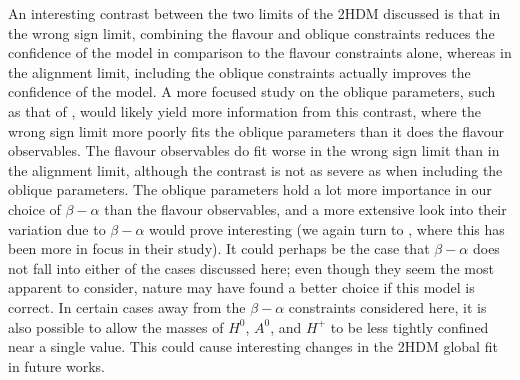 \documentclass[a4paper,12pt]{article}
\begin{document}
An interesting contrast between the two limits of the 2HDM discussed is that in the wrong sign limit, combining the flavour and oblique constraints reduces the confidence of the model in comparison to the flavour constraints alone, whereas in the alignment limit, including the oblique constraints actually improves the confidence of the model. 
A more focused study on the oblique parameters, such as that of \cite{james}, would likely yield more information from this contrast, where the wrong sign limit more poorly fits the oblique parameters than it does the flavour observables. 
The flavour observables do fit worse in the wrong sign limit than in the alignment limit, although the contrast is not as severe as when including the oblique parameters.
The oblique parameters hold a lot more importance in our choice of $\beta-\alpha$ than the flavour observables, and a more extensive look into their variation due to $\beta-\alpha$ would prove interesting (we again turn to \cite{james}, where this has been more in focus in their study). 
It could perhaps be the case that $\beta-\alpha$ does not fall into either of the cases discussed here; even though they seem the most apparent to consider, nature may have found a better choice if this model is correct.
In certain cases away from the $\beta-\alpha$ constraints considered here, it is also possible to allow the masses of $H^0$, $A^0$, and $H^+$ to be less tightly confined near a single value. 
This could cause interesting changes in the 2HDM global fit in future works.
\end{document}
